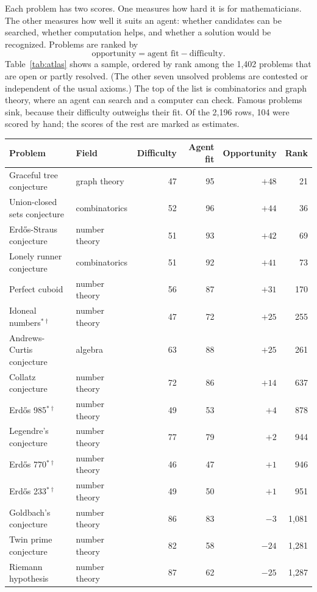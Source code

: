 \documentclass[11pt]{amsart}
\begin{document}
Each problem has two scores. One measures how hard it is for mathematicians. The other measures how well it suits an agent: whether candidates can be searched, whether computation helps, and whether a solution would be recognized. Problems are ranked by
\[
\text{opportunity}=\text{agent fit}-\text{difficulty}.
\]
Table~\ref{tab:atlas} shows a sample, ordered by rank among the 1{,}402 problems that are open or partly resolved. (The other seven unsolved problems are contested or independent of the usual axioms.) The top of the list is combinatorics and graph theory, where an agent can search and a computer can check. Famous problems sink, because their difficulty outweighs their fit. Of the 2{,}196 rows, 104 were scored by hand; the scores of the rest are marked as estimates.

\begin{table}[ht]
\small
\begin{tabular}{@{}llrrrr@{}}
\toprule
Problem & Field & Difficulty & Agent fit & Opportunity & Rank\\
\midrule
Graceful tree conjecture & graph theory & 47 & 95 & $+48$ & 21\\
Union-closed sets conjecture & combinatorics & 52 & 96 & $+44$ & 36\\
Erd\H{o}s-Straus conjecture & number theory & 51 & 93 & $+42$ & 69\\
Lonely runner conjecture & combinatorics & 51 & 92 & $+41$ & 73\\
Perfect cuboid & number theory & 56 & 87 & $+31$ & 170\\
Idoneal numbers$^{*\dagger}$ & number theory & 47 & 72 & $+25$ & 255\\
Andrews-Curtis conjecture & algebra & 63 & 88 & $+25$ & 261\\
Collatz conjecture & number theory & 72 & 86 & $+14$ & 637\\
Erd\H{o}s 985$^{*\dagger}$ & number theory & 49 & 53 & $+4$ & 878\\
Legendre's conjecture & number theory & 77 & 79 & $+2$ & 944\\
Erd\H{o}s 770$^{*\dagger}$ & number theory & 46 & 47 & $+1$ & 946\\
Erd\H{o}s 233$^{*\dagger}$ & number theory & 49 & 50 & $+1$ & 951\\
Goldbach's conjecture & number theory & 86 & 83 & $-3$ & 1{,}081\\
Twin prime conjecture & number theory & 82 & 58 & $-24$ & 1{,}281\\
Riemann hypothesis & number theory & 87 & 62 & $-25$ & 1{,}287\\

\end{tabular}
\end{table}
\end{document}
